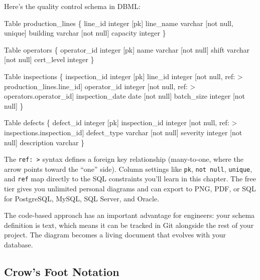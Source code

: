 \documentclass[
  letterpaper,
  DIV=11,
  numbers=noendperiod]{scrreprt}
\newenvironment{Shaded}{\begin{snugshade}}{\end{snugshade}}
\newcommand{\NormalTok}[1]{\textcolor[rgb]{0.00,0.23,0.31}{#1}}
\begin{document}
Here's the quality control schema in DBML:

\begin{codelisting}

\caption{\texttt{dbdiagram.io}}

\begin{Shaded}
\begin{Highlighting}[]
\NormalTok{Table production\_lines \{}
\NormalTok{  line\_id integer [pk]}
\NormalTok{  line\_name varchar [not null, unique]}
\NormalTok{  building varchar [not null]}
\NormalTok{  capacity integer}
\NormalTok{\}}

\NormalTok{Table operators \{}
\NormalTok{  operator\_id integer [pk]}
\NormalTok{  name varchar [not null]}
\NormalTok{  shift varchar [not null]}
\NormalTok{  cert\_level integer}
\NormalTok{\}}

\NormalTok{Table inspections \{}
\NormalTok{  inspection\_id integer [pk]}
\NormalTok{  line\_id integer [not null, ref: \textgreater{} production\_lines.line\_id]}
\NormalTok{  operator\_id integer [not null, ref: \textgreater{} operators.operator\_id]}
\NormalTok{  inspection\_date date [not null]}
\NormalTok{  batch\_size integer [not null]}
\NormalTok{\}}

\NormalTok{Table defects \{}
\NormalTok{  defect\_id integer [pk]}
\NormalTok{  inspection\_id integer [not null, ref: \textgreater{} inspections.inspection\_id]}
\NormalTok{  defect\_type varchar [not null]}
\NormalTok{  severity integer [not null]}
\NormalTok{  description varchar}
\NormalTok{\}}
\end{Highlighting}
\end{Shaded}

\end{codelisting}

The \texttt{ref:\ \textgreater{}} syntax defines a foreign key
relationship (many-to-one, where the arrow points toward the ``one''
side). Column settings like \texttt{pk}, \texttt{not\ null},
\texttt{unique}, and \texttt{ref} map directly to the SQL constraints
you'll learn in this chapter. The free tier gives you unlimited personal
diagrams and can export to PNG, PDF, or SQL for PostgreSQL, MySQL, SQL
Server, and Oracle.

The code-based approach has an important advantage for engineers: your
schema definition is text, which means it can be tracked in Git
alongside the rest of your project. The diagram becomes a living
document that evolves with your database.

\subsection{Crow's Foot Notation}\label{crows-foot-notation}
\end{document}
